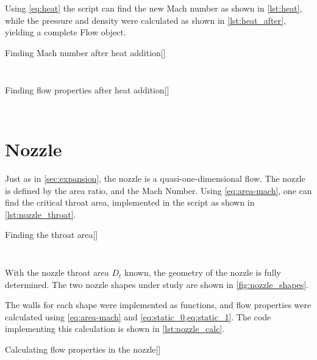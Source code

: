 \documentclass[12pt, openright, oneside, a4paper, english]{unbtex}
\begin{document}
Using \cref{eq:heat} the script can find the new Mach number as shown in \cref{lst:heat}, while the pressure and density were calculated as shown in \cref{lst:heat_after}, yielding a complete Flow object.

\begin{splitcode}[label=lst:heat]{Finding Mach number after heat addition}[]
    \inputminted{python}{listings/heat}
    \tcblower
    \inputminted{output}{listings/heat.o}
\end{splitcode}

\begin{splitcode}[label=lst:heat_after]{Finding flow properties after heat addition}[]
    \inputminted{python}{listings/heat_after}
    \tcblower
    \inputminted{output}{listings/heat_after.o}
\end{splitcode}


\section{Nozzle}

Just as in \cref{sec:expansion}, the nozzle is a quasi-one-dimensional flow. The nozzle is defined by the area ratio, and the Mach Number. Using \cref{eq:area-mach}, one can find the critical throat area, implemented in the script as shown in \cref{lst:nozzle_throat}.

\begin{splitcode}[label=lst:nozzle_throat]{Finding the throat area}[]
    \inputminted{python}{listings/nozzle_throat}
    \tcblower
    \inputminted{output}{listings/nozzle_throat.o}
\end{splitcode}

With the nozzle throat area \(D_t\) known, the geometry of the nozzle is fully determined. The two nozzle shapes under study are shown in \cref{fig:nozzle_shapes}.


The walls for each shape were implemented as functions, and flow properties were calculated using \cref{eq:area-mach} and \cref{eq:static_0,eq:static_1}. The code implementing this calculation is shown in \cref{lst:nozzle_calc}.

\begin{splitcode}[label=lst:nozzle_calc]{Calculating flow properties in the nozzle}[]
    \inputminted{python}{listings/nozzle_calc}
\end{splitcode}
\end{document}
